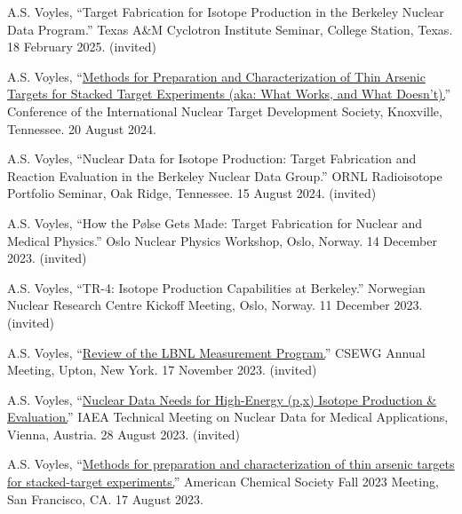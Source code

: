 \begin{bibsection}

\item A.S. Voyles, \enquote{Target Fabrication for Isotope Production in the Berkeley Nuclear Data Program.} Texas A\&M Cyclotron Institute Seminar, College Station, Texas. 18 February 2025. (invited)

\item A.S. Voyles, \enquote{\href{https://intds2024.ornl.gov/}{Methods for Preparation and Characterization of Thin Arsenic Targets for Stacked Target Experiments (aka:  What Works, and What Doesn’t).}}  Conference of the International Nuclear Target Development Society, Knoxville, Tennessee. 20 August 2024.

\item A.S. Voyles, \enquote{Nuclear Data for Isotope Production: Target Fabrication and Reaction Evaluation in the Berkeley Nuclear Data Group.} ORNL Radioisotope Portfolio Seminar, Oak Ridge, Tennessee. 15 August 2024. (invited)

\item A.S. Voyles, \enquote{How the Pølse Gets Made: Target Fabrication for Nuclear and Medical Physics.} Oslo Nuclear Physics Workshop, Oslo, Norway. 14 December 2023. (invited)

\item A.S. Voyles, \enquote{TR-4: Isotope Production Capabilities at Berkeley.} Norwegian Nuclear Research Centre Kickoff Meeting, Oslo, Norway. 11 December 2023. (invited)

\item A.S. Voyles, \enquote{\href{https://indico.bnl.gov/event/18701/}{Review of the LBNL Measurement Program.}} CSEWG Annual Meeting, Upton, New York. 17 November 2023. (invited)


\item A.S. Voyles, \enquote{\href{https://nds.iaea.org/publications/indc/indc-nds-0884/}{Nuclear Data Needs for High-Energy (p,x) Isotope Production \& Evaluation.}} IAEA Technical Meeting on Nuclear Data for Medical Applications, Vienna, Austria. 28 August 2023. (invited)

\item A.S. Voyles, \enquote{\href{https://acs.digitellinc.com/sessions/583121/view}{Methods for preparation and characterization of thin arsenic targets for stacked-target experiments.}} American Chemical Society Fall 2023 Meeting, San Francisco, CA. 17 August 2023. 


\end{bibsection}
